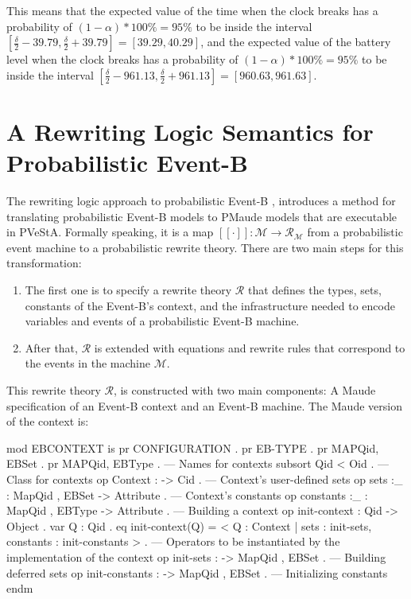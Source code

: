 This means that the expected value of the time when the clock breaks has a probability of $(1-\alpha)*100\% = 95\%$ to be inside the interval $[\frac{\delta}{2} - 39.79, \frac{\delta}{2} + 39.79] = [39.29, 40.29]$, and the expected value of the battery level when the clock breaks has a probability of $(1-\alpha)*100\% = 95\%$ to be inside the interval $[\frac{\delta}{2} - 961.13, \frac{\delta}{2} + 961.13] = [960.63, 961.63]$.


\section{A Rewriting Logic Semantics for Probabilistic Event-B}
The rewriting logic approach to probabilistic Event-B \cite{Olarte}, introduces a method for translating probabilistic Event-B models to PMaude models that are executable in PVeStA. Formally speaking, it is a map $[[ \cdot ]]: \mathscr{M} \rightarrow \mathscr{R}_\mathscr{M}$ from a probabilistic event machine to a probabilistic rewrite theory. There are two main steps for this transformation:

\begin{enumerate}
    \item The first one is to specify a rewrite theory $\mathscr{R}$ that defines the types, sets, constants of the Event-B's context, and the infrastructure needed to encode variables and events of a probabilistic Event-B machine.
    \item After that, $\mathscr{R}$ is extended with equations and rewrite rules that correspond to the events in the machine $\mathscr{M}$.
\end{enumerate}
This rewrite theory $\mathscr{R}$, is constructed with two main components: A Maude specification of an Event-B context and an Event-B machine. The Maude version of the context is:
\\
\begin{maude}
mod EBCONTEXT is 
  pr CONFIGURATION . pr EB-TYPE  . pr MAP{Qid, EBSet} . pr MAP{Qid, EBType} .
  --- Names for contexts
  subsort Qid < Oid .
  --- Class for contexts
  op Context  : -> Cid . 
  --- Context's user-defined sets
  op sets :_      : Map{Qid , EBSet}  -> Attribute .
  --- Context's constants
  op constants :_ : Map{Qid , EBType} -> Attribute .
  --- Building a context
  op init-context : Qid -> Object .                         
  var Q : Qid .
  eq init-context(Q) = < Q : Context | sets : init-sets,
                         constants : init-constants  > .
  --- Operators to be instantiated by the implementation of the context
  op init-sets : ->  Map{Qid , EBSet} . --- Building deferred sets
  op init-constants : ->  Map{Qid , EBSet} . --- Initializing constants 
endm
\end{maude}

